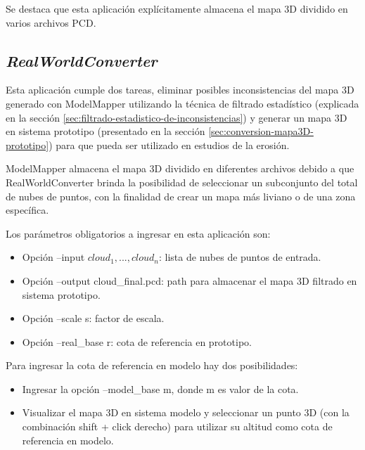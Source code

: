 Se destaca que esta aplicación explícitamente almacena el mapa 3D dividido en varios archivos PCD. 

\subsection{\textit{RealWorldConverter}}
 
Esta aplicación cumple dos tareas, eliminar posibles inconsistencias del mapa 3D generado con ModelMapper utilizando la técnica de filtrado estadístico (explicada en la sección \ref{sec:filtrado-estadistico-de-inconsistencias}) y generar un mapa 3D en sistema prototipo (presentado en la sección \ref{sec:conversion-mapa3D-prototipo}) para que pueda ser utilizado en estudios de la erosión.

ModelMapper almacena el mapa 3D dividido en diferentes archivos debido a que RealWorldConverter brinda la posibilidad de seleccionar un subconjunto del total de nubes de puntos, con la finalidad de crear un mapa más liviano o de una zona específica. 

Los parámetros obligatorios a ingresar en esta aplicación son:

\begin{itemize}
\item Opción --input $ cloud_{1}, ..., cloud_{n} $: lista de nubes de puntos de entrada.

\item Opción --output cloud\_final.pcd: path para almacenar el mapa 3D filtrado en sistema prototipo.

\item Opción --scale s: factor de escala.

\item Opción --real\_base r: cota de referencia en prototipo.

\end{itemize}

Para ingresar la cota de referencia en modelo hay dos posibilidades: 
\begin{itemize}

\item Ingresar la opción --model\_base m, donde m es valor de la cota.

\item Visualizar el mapa 3D en sistema modelo y seleccionar un punto 3D (con la combinación shift + click derecho) para utilizar su altitud como cota de referencia en modelo.

\end{itemize}



